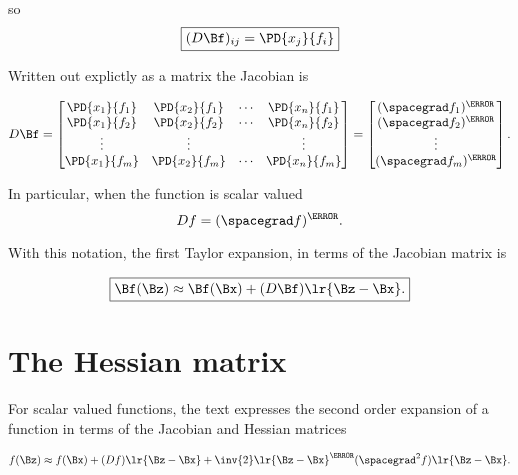 so
\begin{dmath}\label{eqn:jacobianAndHessian:240}
\boxed{
(D \Bf)_{ij} = \PD{x_j}{f_i}
}
\end{dmath}

Written out explictly as a matrix the Jacobian is

\begin{equation}\label{eqn:jacobianAndHessian:320}
D \Bf
=
\begin{bmatrix}
\PD{x_1}{f_1} & \PD{x_2}{f_1} & \cdots & \PD{x_n}{f_1} \\
\PD{x_1}{f_2} & \PD{x_2}{f_2} & \cdots & \PD{x_n}{f_2} \\
\vdots & \vdots & & \vdots \\
\PD{x_1}{f_m} & \PD{x_2}{f_m} & \cdots & \PD{x_n}{f_m} \\
\end{bmatrix}
=
\begin{bmatrix}
(\spacegrad f_1)^\T \\
(\spacegrad f_2)^\T \\
\vdots \\
(\spacegrad f_m)^\T
\end{bmatrix}.
\end{equation}

In particular, when the function is scalar valued
\begin{dmath}\label{eqn:jacobianAndHessian:261}
D f = (\spacegrad f)^\T.
\end{dmath}

With this notation, the first Taylor expansion, in terms of the Jacobian matrix is

\begin{dmath}\label{eqn:jacobianAndHessian:260}
\boxed{
\Bf(\Bz)
\approx \Bf(\Bx) + (D \Bf) \lr{ \Bz - \Bx }.
}
\end{dmath}

\section{The Hessian matrix}

For scalar valued functions, the text expresses the second order expansion of a function in terms of the Jacobian and Hessian matrices

\begin{dmath}\label{eqn:jacobianAndHessian:271}
f(\Bz)
\approx f(\Bx) + (D f) \lr{ \Bz - \Bx }
+ \inv{2} \lr{ \Bz - \Bx }^\T (\spacegrad^2 f) \lr{ \Bz - \Bx }.
\end{dmath}

